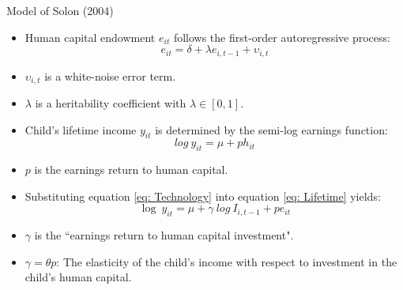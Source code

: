 \documentclass{beamer}
\begin{document}
\begin{frame}{Model of Solon (2004)}

\begin{itemize}

\item \footnotesize Human capital endowment $e_{it}$ follows the first-order autoregressive process: 
\begin{equation} \label{eq: Human}
e_{it}=\delta + \lambda e_{i,t-1}+\upsilon_{i,t}
\end{equation}

\item \tiny $\upsilon_{i,t}$ is a white-noise error term.
\item \tiny $\lambda$ is a heritability coefficient with $\lambda \in [0,1]$.

\item \footnotesize Child’s lifetime income $y_{it}$ is determined by the semi-log earnings function:
\begin{equation} \label{eq: Lifetime}
log \ y_{it}=\mu + ph_{it} 
\end{equation}

\item \tiny $p$ is the earnings return to human capital.

\item \footnotesize Substituting equation \eqref{eq: Technology} into equation \eqref{eq: Lifetime} yields: 
\begin{equation} \label{eq: Substituting}
\log \ y_{it}=\mu + \gamma \ log \ I_{i,t-1} + pe_{it}
\end{equation}

\item \tiny $\gamma$ is the “earnings return to human capital investment".
\item \tiny $ \gamma = \theta p $: The elasticity of the child’s income with respect to investment in the child’s human capital.

\end{itemize}
\end{frame}
\end{document}
